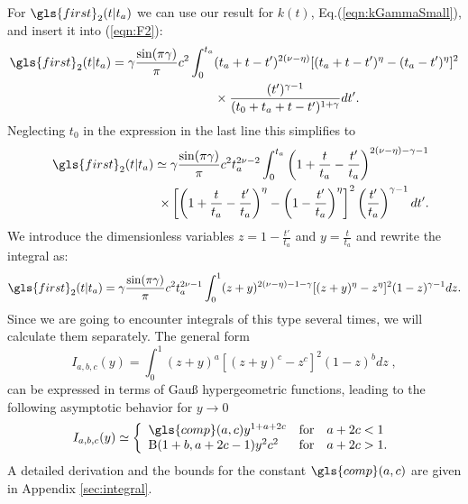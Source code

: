 For $\gls{first}_{2}(t|t_a)$ we can use our result for $k(t)$, Eq.(\ref{eqn:kGammaSmall}), and insert it into (\ref{eqn:F2}): 
\begin{align}
\gls{first}_{2}(t|t_a) = \gamma\frac{\sin(\pi \gamma)}{\pi}  c^2 \int^{t_a}_0 & (t_a+t-t')^{2(\nu-\eta)}[(t_a+t-t')^\eta-(t_a-t')^\eta]^2  \nonumber \\
& \times \frac{(t')^{\gamma-1}}{(t_0+t_a+t-t')^{1+\gamma}} dt'.
\end{align}
%
Neglecting $t_0$ in the expression in the last line this simplifies to
%
\begin{align}
&& \gls{first}_{2}(t|t_a) \simeq  \gamma \frac{\sin(\pi \gamma)}{\pi}  c^2 t_a^{2\nu-2} \int^{t_a}_0 \left(1+\frac{t}{t_a}-\frac{t'}{t_a} \right)^{2(\nu-\eta)-\gamma-1} \nonumber \\
&& \;\; \times \left[ \left(1+\frac{t}{t_a}-\frac{t'}{t_a} \right)^\eta-\left(1- \frac{t'}{t_a}\right)^\eta \right]^2 \left( \frac{t'}{t_a}\right)^{\gamma-1} dt' .
\end{align}
%
We introduce the dimensionless variables $z = 1-\frac{t'}{t_a}$ and $y = \frac{t}{t_a}$ and rewrite the integral as:
%
\begin{align}
 \gls{first}_{2}(t|t_a) = \gamma \frac{\sin(\pi \gamma)}{\pi}  c^2 t_a^{2\nu-1}  \int^{1}_0 (z+y)^{2(\nu-\eta)-1-\gamma}[(z+y)^\eta-z^\eta]^2 (1-z)^{\gamma-1} dz . 
\end{align}
Since we are going to encounter integrals of this type several times, we will calculate them separately. The general form
\begin{equation}
I_{a,b,c}(y) = \int^{1}_0 (z+y)^{a}[(z+y)^c-z^c]^2 (1-z)^{b} dz \; , \label{eqn:Iabc} 
\end{equation}
can be expressed in terms of Gau{\ss} hypergeometric functions, leading to the following asymptotic behavior for $y \to 0$
\begin{equation}
I_{a,b,c}(y) \simeq \left\{ \begin{array}{l l l}
\gls{comp}(a,c) y^{1+a+2c}    & \mathrm{for} &  a+2c < 1 \\
 \mathrm{B}(1+b,a+2c-1)y^2 c^2  & \mathrm{for} & a+2c > 1.
\end{array} \right. \label{eqn:IabcAsymptotic}
\end{equation}
A detailed derivation and the bounds for the constant $\gls{comp}(a,c)$ are given in Appendix \ref{sec:integral}.\\

